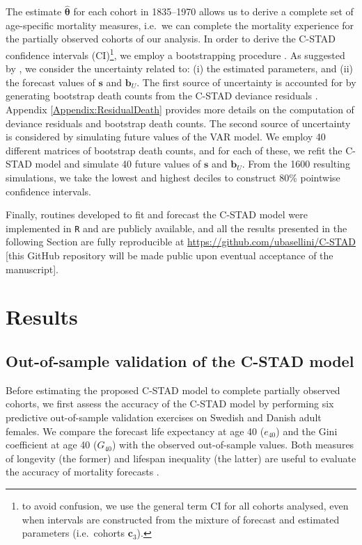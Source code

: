 \documentclass[11pt, a4paper]{article}
\begin{document}
The estimate $\hat{\bm{\theta}}$ for each cohort in 1835--1970 allows us to derive a complete set of age-specific mortality measures, i.e.~we can complete the mortality experience for the partially observed cohorts of our analysis. In order to derive the C-STAD confidence intervals (CI)\footnote{to avoid confusion, we use the general term CI for all cohorts analysed, even when intervals are constructed from the mixture of forecast and estimated parameters (i.e.~cohorts $\bm{c}_3$).}, we employ a bootstrapping procedure \citep{efron1994introduction}. As suggested by \cite{keilman2006prediction}, we consider the uncertainty related to: (i) the estimated parameters, and (ii) the forecast values of $\bm{s}$ and $\bm{b}_U$. The first source of uncertainty is accounted for by generating bootstrap death counts from the C-STAD deviance residuals \cite[as in, for example,][]{koissi2006evaluating,renshaw2008simulation,ouellette2012regional}. Appendix \ref{Appendix:ResidualDeath} provides more details on the computation of deviance residuals and bootstrap death counts. The second source of uncertainty is considered by simulating future values of the VAR model. We employ 40 different matrices of bootstrap death counts, and for each of these, we refit the C-STAD model and simulate 40 future values of $\bm{s}$ and $\bm{b}_U$. From the 1600 resulting simulations, we take the lowest and highest deciles to construct 80\% pointwise confidence intervals.

Finally, routines developed to fit and forecast the C-STAD model were implemented in \texttt{R} \citep{Rcite} and are publicly available, and all the results presented in the following Section are fully reproducible at \url{https://github.com/ubasellini/C-STAD} [this GitHub repository will be made public upon eventual acceptance of the manuscript]. 

\section{Results}
\label{Sec:Results}

\subsection{Out-of-sample validation of the C-STAD model}
\label{Subsec:Out-of-sample}
Before estimating the proposed C-STAD model to complete partially observed cohorts, we first assess the accuracy of the C-STAD model by performing six predictive out-of-sample validation exercises on Swedish and Danish adult females. We compare the forecast life expectancy at age 40 ($e_{40}$) and the Gini coefficient at age 40 ($G_{40}$) with the observed out-of-sample values. Both measures of longevity (the former) and lifespan inequality (the latter) are useful to evaluate the accuracy of mortality forecasts \citep{bohk2017lifespan}. 
\end{document}
